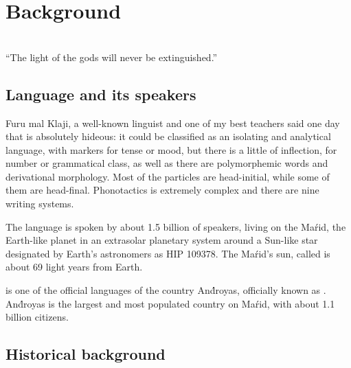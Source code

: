 \chapter{Background}
\label{ch:background}

\begin{flushright}\small
    \\
    ``The light of the gods will never be extinguished.''
\end{flushright}\bigskip

\section{Language and its speakers}

Furu mal Klaji, a well-known linguist and one of my best teachers said one day
that \andro is absolutely hideous: it could be classified as an isolating and
analytical language, with markers for tense or mood, but there is a little of
inflection, for number or grammatical class, as well as there are polymorphemic
words and derivational morphology. Most of the particles are head-initial, while
some of them are head-final. Phonotactics is extremely complex and there are
nine writing systems.

\skipline

The \andro language is spoken by about 1.5 billion of speakers, living on the
Maŕid, the Earth-like planet in an extrasolar planetary system around a Sun-like
star designated by Earth's astronomers as HIP 109378. The Maŕid's sun, called
 is about 69 light years from Earth.

\skipline

\andro is one of the official languages of the country And́royas, officially
known as . And́royas is the
largest and most populated country on Maŕid, with about 1.1 billion citizens.

\section{Historical background}

